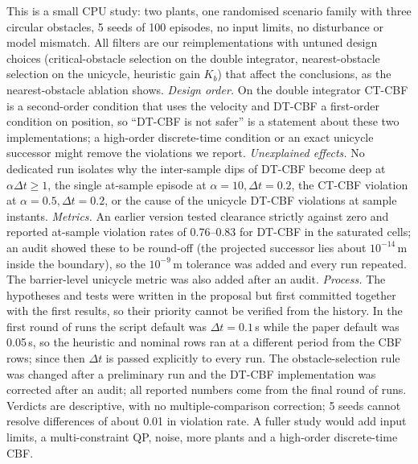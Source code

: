 This is a small CPU study: two plants, one randomised scenario family with three circular obstacles, 5 seeds of 100 episodes, no input limits, no disturbance or model mismatch. All filters are our reimplementations with untuned design choices (critical-obstacle selection on the double integrator, nearest-obstacle selection on the unicycle, heuristic gain $K_b$) that affect the conclusions, as the nearest-obstacle ablation shows. \emph{Design order.} On the double integrator CT-CBF is a second-order condition that uses the velocity and DT-CBF a first-order condition on position, so ``DT-CBF is not safer'' is a statement about these two implementations; a high-order discrete-time condition or an exact unicycle successor might remove the violations we report. \emph{Unexplained effects.} No dedicated run isolates why the inter-sample dips of DT-CBF become deep at $\alpha\Delta t\ge1$, the single at-sample episode at $\alpha=10,\Delta t=0.2$, the CT-CBF violation at $\alpha=0.5,\Delta t=0.2$, or the cause of the unicycle DT-CBF violations at sample instants. \emph{Metrics.} An earlier version tested clearance strictly against zero and reported at-sample violation rates of 0.76--0.83 for DT-CBF in the saturated cells; an audit showed these to be round-off (the projected successor lies about $10^{-14}$\,m inside the boundary), so the $10^{-9}$\,m tolerance was added and every run repeated. The barrier-level unicycle metric was also added after an audit. \emph{Process.} The hypotheses and tests were written in the proposal but first committed together with the first results, so their priority cannot be verified from the history. In the first round of runs the script default was $\Delta t=0.1$\,s while the paper default was 0.05\,s, so the heuristic and nominal rows ran at a different period from the CBF rows; since then $\Delta t$ is passed explicitly to every run. The obstacle-selection rule was changed after a preliminary run and the DT-CBF implementation was corrected after an audit; all reported numbers come from the final round of runs. Verdicts are descriptive, with no multiple-comparison correction; 5 seeds cannot resolve differences of about 0.01 in violation rate. A fuller study would add input limits, a multi-constraint QP, noise, more plants and a high-order discrete-time CBF.
